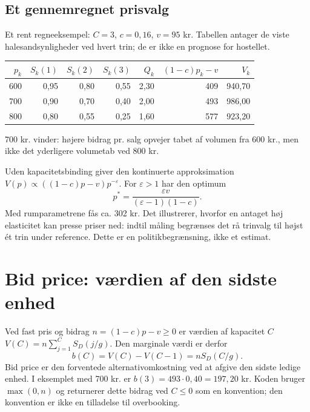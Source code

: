 \documentclass[11pt,a4paper]{article}
\begin{document}
\subsection{Et gennemregnet prisvalg}
Et rent regneeksempel: $C=3$, $c=0{,}16$, $v=95$ kr. Tabellen antager de viste
halesandsynligheder ved hvert trin; de er ikke en prognose for hostellet.
\begin{center}\small
\begin{tabular}{@{}rrrrrrr@{}}\toprule
$p_k$ & $S_k(1)$ & $S_k(2)$ & $S_k(3)$ & $Q_k$ & $(1-c)p_k-v$ & $V_k$\\\midrule
600 & 0,95 & 0,80 & 0,55 & 2,30 & 409 & 940,70\\
700 & 0,90 & 0,70 & 0,40 & 2,00 & 493 & 986,00\\
800 & 0,80 & 0,55 & 0,25 & 1,60 & 577 & 923,20\\\bottomrule
\end{tabular}
\end{center}
700 kr. vinder: højere bidrag pr. salg opvejer tabet af volumen fra 600 kr.,
men ikke det yderligere volumetab ved 800 kr.

Uden kapacitetsbinding giver den kontinuerte approksimation
$V(p)\propto((1-c)p-v)p^{-\varepsilon}$. For $\varepsilon>1$ har den optimum
\begin{equation}p^*=\frac{\varepsilon v}{(\varepsilon-1)(1-c)}.\end{equation}
Med rumparametrene fås ca. 302 kr. Det illustrerer, hvorfor en antaget høj
elasticitet kan presse priser ned: indtil måling begrænses det rå trinvalg til
højst ét trin under reference. Dette er en politikbegrænsning, ikke et estimat.

\newpage
\section{Bid price: værdien af den sidste enhed}
Ved fast pris og bidrag $n=(1-c)p-v\geq0$ er værdien af kapacitet $C$
$V(C)=n\sum_{j=1}^{C}S_D(j/g)$. Den marginale værdi er derfor
\begin{equation}\boxed{b(C)=V(C)-V(C-1)=nS_D(C/g).}\end{equation}
Bid price er den forventede alternativomkostning ved at afgive den sidste
ledige enhed. I eksemplet med 700 kr. er $b(3)=493\cdot0{,}40=197{,}20$ kr.
Koden bruger $\max(0,n)$ og returnerer dette bidrag ved $C\leq0$ som en
konvention; den konvention er ikke en tilladelse til overbooking.
\end{document}
